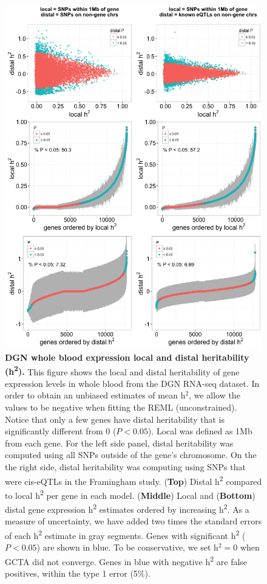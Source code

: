 \documentclass[10pt,letterpaper]{article}
\begin{document}
\begin{figure}[H]
\includegraphics[width=12cm]{Figures/Fig-DGN-jt-h2-UNCONSTRAINED.png}
\caption{{\bf DGN whole blood expression local and distal heritability (h\textsuperscript{2}).} 
%
This figure shows the local and distal heritability of gene expression levels in whole blood from the DGN RNA-seq dataset. In order to obtain an unbiased estimates of mean h$^2$, we allow the values to be negative when fitting the REML (unconstrained). Notice that only a few genes have distal heritability that is significantly different from 0 ($P<0.05$). 
Local was defined as 1Mb from each gene. For the left side panel, distal heritability was computed using all SNPs outside of the gene's chromosome. On the the right side, distal heritability was computing using SNPs that were cis-eQTLs in the Framingham study.
%
(\textbf{Top}) Distal h\textsuperscript{2} compared to local
h\textsuperscript{2} per gene in each model. (\textbf{Middle}) Local and
(\textbf{Bottom}) distal gene expression h\textsuperscript{2} estimates
ordered by increasing h\textsuperscript{2}. 
As a measure of uncertainty, we have added two times the standard errors of each h\textsuperscript{2} estimate in gray segments. Genes with significant h\textsuperscript{2} ($P<0.05$) are shown in blue.  To be conservative, we set h$^2=0$ when GCTA did not converge. Genes in blue with negative h\textsuperscript{2} are false positives, within the type 1 error (5\%).
}
\label{fig-dgn-jt-h2}
\end{figure}
\end{document}
